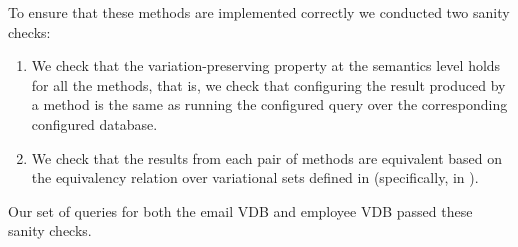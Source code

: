 To ensure that these methods are implemented correctly we conducted two
sanity checks:
\begin{enumerate}
\item We check that the variation-preserving property at the semantics level
holds for all the methods, that is, we check that configuring the result produced by
a method is the same as running the configured query over the corresponding 
configured database.
%
\item We check that the results from each pair of methods are equivalent based on
the equivalency relation over variational sets defined in  
(specifically, in ).
\end{enumerate}

Our set of queries for both the email VDB and employee VDB passed these sanity checks.
